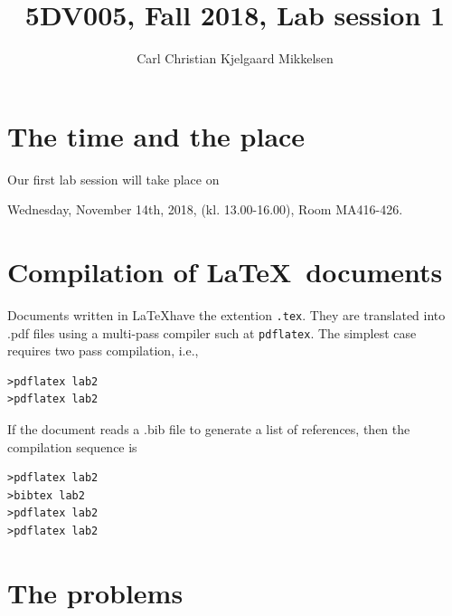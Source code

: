 \documentclass[a4paper,12pt]{article}
\newcounter{problem}
\begin{document}
\title{5DV005, Fall 2018, Lab session 1}
\author{Carl Christian Kjelgaard Mikkelsen}

\maketitle
\tableofcontents

\section{The time and the place}
Our first lab session will take place on
\begin{center}
Wednesday, November 14th, 2018, (kl. 13.00-16.00), Room MA416-426.
\end{center}

\section{Compilation of \LaTeX~documents}

Documents written in \LaTeX have the extention {\tt .tex}. They are translated into .pdf files using a multi-pass compiler such at {\tt pdflatex}. The simplest case requires two pass compilation, i.e.,
\begin{verbatim}
>pdflatex lab2
>pdflatex lab2
\end{verbatim}
If the document reads a .bib file to generate a list of references, then the compilation sequence is
\begin{verbatim}
>pdflatex lab2
>bibtex lab2         
>pdflatex lab2
>pdflatex lab2
\end{verbatim}
\newpage


\section{The problems}
\end{document}
